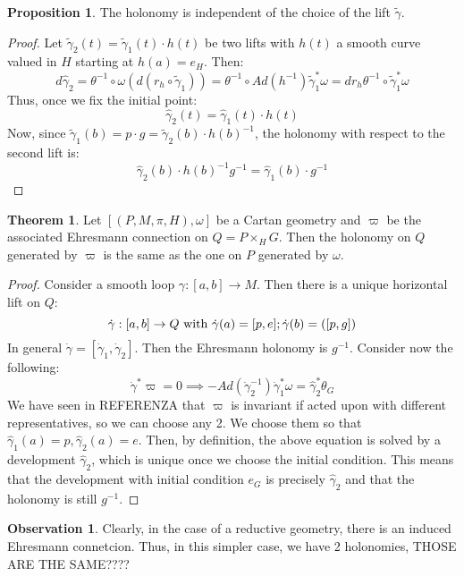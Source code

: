\documentclass[12pt,a4paper]{report}
\theoremstyle{definition}
\theoremstyle{Theorem}
\newtheorem{Theo}[Def]{Theorem}
\newtheorem{Prop}[Def]{Proposition}
\theoremstyle{definition}
\theoremstyle{definition}
\newtheorem{Obs}[Def]{Observation}
\begin{document}
	\begin{Prop}
		The holonomy is independent of the choice of the lift $\tilde{\gamma}$.
	\end{Prop}
	\begin{proof}
		Let $\tilde{\gamma}_2(t)=\tilde{\gamma}_1(t)\cdot h(t)$ be two lifts with $h(t)$ a smooth curve valued in $H$ starting at $h(a)=e_H$. Then:
		$$d\hat{\gamma}_2=\theta^{-1}\circ \omega (d(r_h\circ \tilde{\gamma}_1))=\theta^{-1}\circ Ad(h^{-1})\tilde{\gamma}_1^*\omega=dr_{h}\theta^{-1}\circ \tilde{\gamma}_1^*\omega$$
		Thus, once we fix the initial point:
		$$\hat{\gamma}_2(t)=\hat{\gamma}_1(t)\cdot h(t)$$
		Now, since $\tilde{\gamma}_1(b)=p\cdot g=\tilde{\gamma}_2(b)\cdot h(b)^{-1}$, the holonomy with respect to the second lift is:
		$$\hat{\gamma}_2(b)\cdot h(b)^{-1}g^{-1}=\hat{\gamma}_1(b)\cdot g^{-1}$$
	\end{proof}
	\begin{Theo}
		Let $[(P,M,\pi,H),\omega]$ be a Cartan geometry and $\varpi$ be the associated Ehresmann connection on $Q=P\times_H G$. Then the holonomy on $Q$ generated by $\varpi$ is the same as the one on $P$ generated by $\omega$.
	\end{Theo}
	\begin{proof}
		Consider a smooth loop $\gamma:[a,b]\rightarrow M$. Then there is a unique horizontal lift on $Q$:
		$$\dot{\gamma}:[a,b]\rightarrow Q \hbox{ with }\dot{\gamma}(a)=[p,e];\dot{\gamma}(b)=([p,g])$$
		In general $\dot{\gamma}=[\dot{\gamma}_1,\dot{\gamma}_2]$.
		Then the Ehresmann holonomy is $g^{-1}$. Consider now the following:
		$$\dot{\gamma}^*\varpi=0\implies-Ad(\dot{\gamma}_2^{-1})\dot{\gamma}_1^*\omega=\hat{\gamma}_2^*\theta_G$$
		We have seen in REFERENZA that $\varpi$ is invariant if acted upon with different representatives, so we can choose any 2. We choose them so that $\hat{\gamma}_1(a)=p,\hat{\gamma}_2(a)=e$. Then, by definition, the above equation is solved by a development $\hat{\gamma}_2$, which is unique once we choose the initial condition. This means that the development with initial condition $e_G$ is precisely $\hat{\gamma}_2$ and that the holonomy is still $g^{-1}$.
	\end{proof}
	\begin{Obs}
		Clearly, in the case of a reductive geometry, there is an induced Ehresmann connetcion. Thus, in this simpler case, we have 2 holonomies,  THOSE ARE THE SAME????
	\end{Obs}
\end{document}

